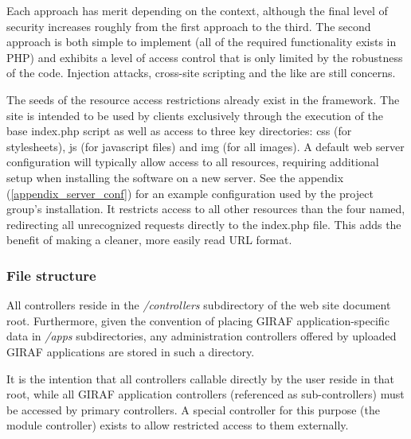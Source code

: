 Each approach has merit depending on the context, although the final level of security increases roughly from the first approach to the third. The second approach is both simple to implement (all of the required functionality exists in PHP) and exhibits a level of access control that is only limited by the robustness of the code. Injection attacks, cross-site scripting and the like are still concerns.

The seeds of the resource access restrictions already exist in the framework. The site is intended to be used by clients exclusively through the execution of the base index.php script as well as access to three key directories: css (for stylesheets), js (for javascript files) and img (for all images). A default web server configuration will typically allow access to all resources, requiring additional setup when installing the software on a new server. See the appendix (\vref{appendix_server_conf}) for an example configuration used by the project group's installation. It restricts access to all other resources than the four named, redirecting all unrecognized requests directly to the index.php file. This adds the benefit of making a cleaner, more easily read URL format.

\subsubsection*{File structure}
All controllers reside in the \emph{/controllers} subdirectory of the web site document root. Furthermore, given the convention of placing GIRAF application-specific data in \emph{/apps} subdirectories, any administration controllers offered by uploaded GIRAF applications are stored in such a directory.

It is the intention that all controllers callable directly by the user reside in that root, while all GIRAF application controllers (referenced as sub-controllers) must be accessed by primary controllers. A special controller for this purpose (the module controller) exists to allow restricted access to them externally.

